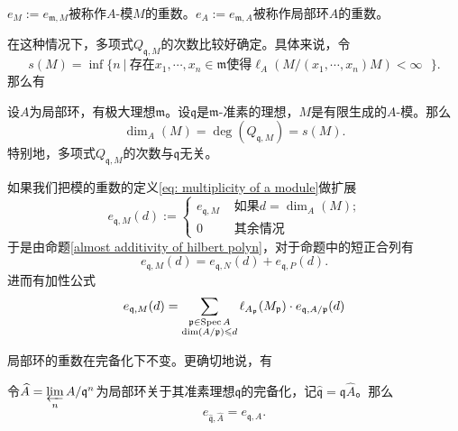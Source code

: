 \begin{definition}
$e_M := e_{\mathfrak{m},M}$被称作$A$-模$M$的重数。$e_A := e_{\mathfrak{m},A}$被称作局部环$A$的重数。
\end{definition}

在这种情况下，多项式$Q_{\mathfrak{q},M}$的次数比较好确定。具体来说，令
\begin{equation}
s(M) = \inf\{n \ |\ \text{存在$x_1, \cdots, x_n\in \mathfrak{m}$使得$\ell_A(M/(x_1, \cdots, x_n)M) < \infty$ }\}.
\end{equation}
那么有
\begin{theorem} 
设$A$为局部环，有极大理想$\mathfrak{m}$。设$\mathfrak{q}$是$\mathfrak{m}$-准素的理想，$M$是有限生成的$A$-模。那么
\begin{equation}
\dim_A(M) = \deg(Q_{\mathfrak{q},M}) = s(M).
\end{equation}
特别地，多项式$Q_{\mathfrak{q},M}$的次数与$\mathfrak{q}$无关。
\end{theorem}

如果我们把模的重数的定义\eqref{eq: multiplicity of a module}做扩展
\begin{equation}
e_{\mathfrak{q},M}(d) := \begin{cases}
e_{\mathfrak{q},M} & \text{ 如果$d = \dim_A(M)$;} \\
0 & \text{ 其余情况}
\end{cases}
\end{equation}
于是由命题\ref{almost additivity of hilbert polyn}，对于命题中的短正合列有
\begin{equation}
e_{\mathfrak{q},M}(d) = e_{\mathfrak{q},N}(d) + e_{\mathfrak{q},P}(d).
\end{equation}
进而有加性公式
\begin{equation}
e_{\mathfrak{q},M}(d) = \sum\limits_{\substack{\mathfrak{p} \in \operatorname{Spec} A \\ \dim(A/\mathfrak{p}) \leqslant d}} \ell_{A_{\mathfrak{p}}}(M_{\mathfrak{p}}) \cdot e_{\mathfrak{q}, A/\mathfrak{p}}(d)
\end{equation}

局部环的重数在完备化下不变。更确切地说，有

\begin{proposition}
令$\widehat{A} = \varprojlim\limits_n A / \mathfrak{q}^n$为局部环关于其准素理想$\mathfrak{q}$的完备化，记$\widehat{\mathfrak{q}} = \mathfrak{q}\widehat{A}$。那么
\begin{equation}
e_{\widehat{\mathfrak{q}}, \widehat{A}} = e_{\mathfrak{q}, A}.
\end{equation}
\end{proposition}

